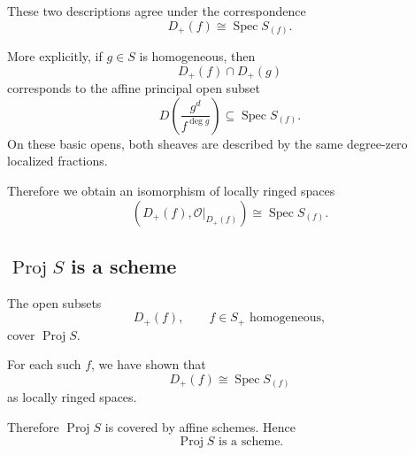 These two descriptions agree under the correspondence
\[
D_+(f)\cong \operatorname{Spec} S_{(f)}.
\]

More explicitly, if \(g\in S\) is homogeneous, then
\[
D_+(f)\cap D_+(g)
\]
corresponds to the affine principal open subset
\[
D\left(\frac{g^d}{f^{\deg g}}\right)
\subseteq \operatorname{Spec} S_{(f)}.
\]
On these basic opens, both sheaves are described by the same degree-zero localized
fractions.

Therefore we obtain an isomorphism of locally ringed spaces
\[
\boxed{
	\left(D_+(f),\mathcal O|_{D_+(f)}\right)
	\cong
	\operatorname{Spec} S_{(f)}.
}
\]

\subsection{\texorpdfstring{$\operatorname{Proj} S$}{Proj S} is a scheme}

The open subsets
\[
D_+(f),
\qquad f\in S_+ \text{ homogeneous},
\]
cover \(\operatorname{Proj} S\).

For each such \(f\), we have shown that
\[
D_+(f)\cong \operatorname{Spec} S_{(f)}
\]
as locally ringed spaces.

Therefore \(\operatorname{Proj} S\) is covered by affine schemes. Hence
\[
\boxed{
	\operatorname{Proj} S \text{ is a scheme.}
}
\]

